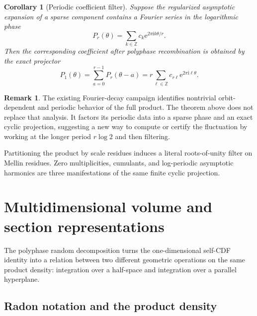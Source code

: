 \documentclass[11pt,oneside]{article}
\newtheorem{corollary}[theorem]{Corollary}
\theoremstyle{definition}
\newtheorem{remark}[theorem]{Remark}
\newcommand{\e}{\mathrm e}
\newcommand{\ii}{\mathrm i}
\newcommand{\Z}{\mathbb Z}
\begin{document}
\begin{corollary}[Periodic coefficient filter]
\label{p2:cor:periodic-filter}
Suppose the regularized asymptotic expansion of a sparse component contains a
Fourier series in the logarithmic phase
\begin{equation}
 P_r(\theta)=\sum_{k\in\Z}c_k\e^{2\pi\ii k\theta/r}.        \label{p2:eq:Pr-phase}
\end{equation}
Then the corresponding coefficient after polyphase recombination is obtained
by the exact projector
\begin{equation}
 P_1(\theta)=\sum_{a=0}^{r-1}P_r(\theta-a)
 =r\sum_{\ell\in\Z}c_{r\ell}\e^{2\pi\ii\ell\theta}.       \label{p2:eq:phase-projector}
\end{equation}
\end{corollary}

\begin{remark}
The existing Fourier-decay campaign identifies nontrivial orbit-dependent and
periodic behavior of the full product.  The theorem above does not replace that
analysis.  It factors its periodic data into a sparse phase and an exact cyclic
projection, suggesting a new way to compute or certify the fluctuation by
working at the longer period $r\log2$ and then filtering.
\end{remark}

\begin{resultbox}
Partitioning the product by scale residues induces a literal roots-of-unity
filter on Mellin residues.  Zero multiplicities, cumulants, and log-periodic
asymptotic harmonics are three manifestations of the same finite cyclic
projection.
\end{resultbox}

\section{Multidimensional volume and section representations}
\label{p2:sec:sections}

The polyphase random decomposition turns the one-dimensional self-CDF identity
into a relation between two different geometric operations on the same product
density: integration over a half-space and integration over a parallel
hyperplane.

\subsection{Radon notation and the product density}
\end{document}

